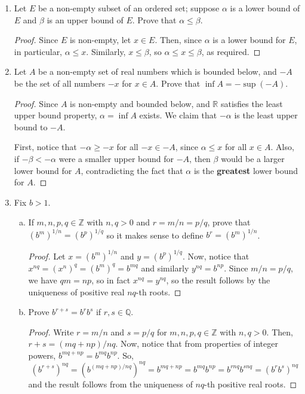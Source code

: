 \documentclass{scrbook}
\newcommand{\Z}{\mathbb{Z}}
\newcommand{\Q}{\mathbb{Q}}
\newcommand{\R}{\mathbb{R}}
\begin{document}
\begin{enumerate}
\item Let $E$ be a non-empty subset of an ordered set; suppose $\alpha$ is a lower bound of $E$ and $\beta$ is an upper bound of $E$. Prove that $\alpha \le \beta$.

\begin{proof}
Since $E$ is non-empty, let $x \in E$. Then, since $\alpha$ is a lower bound for $E$, in particular, $\alpha \le x$. Similarly, $x \le \beta$, so $\alpha \le x \le \beta$, as required.
\end{proof}

\item Let $A$ be a non-empty set of real numbers which is bounded below, and $-A$ be the set of all numbers $-x$ for $x \in A$. Prove that $\inf A = -\sup(-A)$. 

\begin{proof}
Since $A$ is non-empty and bounded below, and $\R$ satisfies the least upper bound property, $\alpha = \inf A$ exists. We claim that $-\alpha$ is the least upper bound to $-A$.

First, notice that $-\alpha \ge -x$ for all $-x \in -A$, since $\alpha \le x$ for all $x \in A$. Also, if $-\beta < -\alpha$ were a smaller upper bound for $-A$, then $\beta$ would be a larger lower bound for $A$, contradicting the fact that $\alpha$ is the \textbf{greatest} lower bound for $A$.
\end{proof}

\item Fix $b > 1$.
\begin{enumerate}[(a)]
\item If $m, n, p, q \in \Z$ with $n, q > 0$ and $r = m/n = p/q$, prove that $(b^m)^{1/n} = (b^p)^{1/q}$ so it makes sense to define $b^r = (b^m)^{1/n}$.

\begin{proof}
Let $x = (b^m)^{1/n}$ and $y = (b^p)^{1/q}$. Now, notice that $x^{nq} = (x^n)^q = (b^m)^q = b^{mq}$ and similarly $y^{nq} = b^{np}$. Since $m/n = p/q$, we have $qm = np$, so in fact $x^{nq} = y^{nq}$, so the result follows by the uniqueness of positive real $nq$-th roots.
\end{proof}

\item Prove $b^{r+s} = b^r b^s$ if $r, s \in \Q$. 

\begin{proof}
Write $r = m/n$ and $s = p/q$ for $m, n, p, q \in \Z$ with $n, q > 0$. Then, $r + s = (mq + np) / nq$. Now, notice that from properties of integer powers, $b^{mq + np} = b^{mq} b^{np}$. So,
\[
	(b^{r+s})^{nq} = (b^{(mq + np) / nq})^{nq} = b^{mq + np} = b^{mq} b^{np} = b^{rnq} b^{snq} = (b^r b^s)^{nq}
\]
and the result follows from the uniqueness of $nq$-th positive real roots. 
\end{proof}


\end{enumerate}
\end{enumerate}
\end{document}
